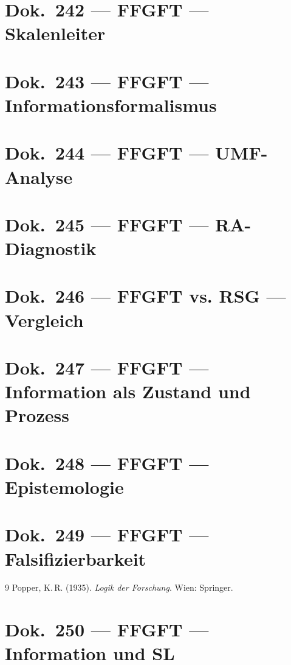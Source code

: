 	\chapter{Dok.~242 --- FFGFT — Skalenleiter}
	
	\chapter{Dok.~243 --- FFGFT — Informationsformalismus}
	
	\chapter{Dok.~244 --- FFGFT — UMF-Analyse}
	
	\chapter{Dok.~245 --- FFGFT — RA-Diagnostik}
	
	\chapter{Dok.~246 --- FFGFT vs. RSG — Vergleich}
	
	\chapter{Dok.~247 --- FFGFT — Information als Zustand und Prozess}
	
	\chapter{Dok.~248 --- FFGFT — Epistemologie}
	
	\chapter{Dok.~249 --- FFGFT — Falsifizierbarkeit}
	
	\begin{thebibliography}{9}
	Popper, K.\,R. (1935). \emph{Logik der Forschung}. Wien: Springer.
	\end{thebibliography}
	\chapter{Dok.~250 --- FFGFT — Information und SL}
	

